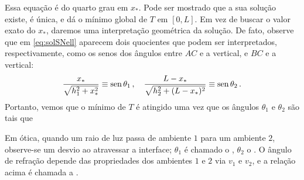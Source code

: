 Essa equação é do quarto grau em $x_*$. Pode ser mostrado que a sua solução
existe, é única, e dá o mínimo global de $T$ em $[0,L]$. 
Em vez de
buscar o valor exato do $x_*$, daremos uma interpretação geométrica da solução.
De fato, observe que em \eqref{eq:solSNell} aparecem dois quocientes 
que podem ser interpretados,
respectivamente, como os senos dos ângulos entre $AC$ e a vertical, e $BC$ e a
vertical:
$$\frac{x_*}{\sqrt{h_1^2+x_*^2}}\equiv
\operatorname{sen} \theta_1\,,\quad\frac{L-x_*}{\sqrt{h_2^2+(L-x_*)^2 }}\equiv \operatorname{sen}
\theta_2\,.$$
Portanto, vemos que o mínimo de $T$ é atingido uma vez que os ângulos
$\theta_1$ e $\theta_2$ são tais que
\begin{center}
\begin{bmlimage}\end{bmlimage}
\end{center}
Em ótica, quando um raio de luz passa de ambiente $1$ para um ambiente $2$,
observe-se um desvio ao atravessar a interface;
$\theta_1$ é chamado o , $\theta_2$ o
. O ângulo de refração depende das propriedades dos
ambientes $1$ e $2$ via $v_1$ e $v_2$, e a relação acima é chamada a
.\\

